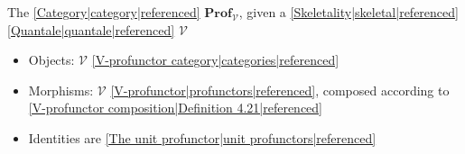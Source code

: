 
The \ref{Category|category|referenced} $\mathbf{Prof}_\mathcal{V}$, given a \ref{Skeletality|skeletal|referenced} \ref{Quantale|quantale|referenced} $\mathcal{V}$

\begin{itemize}
    \item Objects: $\mathcal{V}$ \ref{V-profunctor category|categories|referenced}
    \item Morphisms: $\mathcal{V}$ \ref{V-profunctor|profunctors|referenced}, composed according to \ref{V-profunctor composition|Definition 4.21|referenced}
    \item Identities are \ref{The unit profunctor|unit profunctors|referenced}

  \end{itemize}
